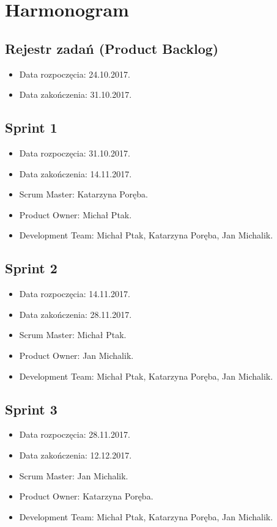 \documentclass[a4paper]{article}
\begin{document}
\section{Harmonogram}

\subsection{Rejestr zadań (Product Backlog)}

\begin{itemize}
	\item Data rozpoczęcia: 24.10.2017.
	\item Data zakończenia: 31.10.2017.
\end{itemize}

\subsection{Sprint 1}

\begin{itemize}
\item Data rozpoczęcia: 31.10.2017.
\item Data zakończenia: 14.11.2017.
\item Scrum Master: Katarzyna Poręba.
\item Product Owner: Michał Ptak.
\item Development Team: Michał Ptak, Katarzyna Poręba, Jan Michalik.
\end{itemize}

\subsection{Sprint 2}

\begin{itemize}
\item Data rozpoczęcia: 14.11.2017.
\item Data zakończenia: 28.11.2017.
\item Scrum Master: Michał Ptak.
\item Product Owner: Jan Michalik.
\item Development Team: Michał Ptak, Katarzyna Poręba, Jan Michalik.
\end{itemize}

\subsection{Sprint 3}

\begin{itemize}
\item Data rozpoczęcia: 28.11.2017.
\item Data zakończenia: 12.12.2017.
\item Scrum Master: Jan Michalik.
\item Product Owner: Katarzyna Poręba.
\item Development Team: Michał Ptak, Katarzyna Poręba, Jan Michalik.
\end{itemize}
\end{document}
